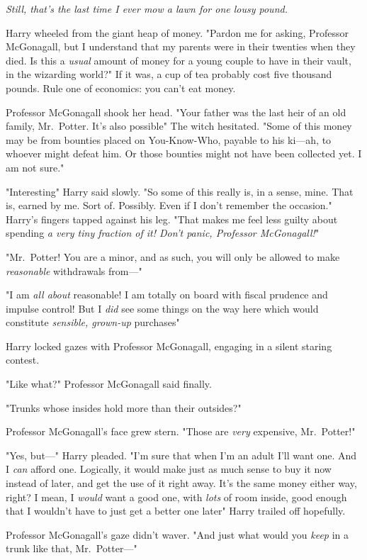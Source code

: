 \emph{Still, that's the last time I ever mow a lawn for one lousy pound.}

Harry wheeled from the giant heap of money. "Pardon me for asking, Professor
McGonagall, but I understand that my parents were in their twenties when they
died. Is this a \emph{usual} amount of money for a young couple to have in
their vault, in the wizarding world?" If it was, a cup of tea probably cost
five thousand pounds. Rule one of economics: you can't eat money.

Professor McGonagall shook her head. "Your father was the last heir of an old
family, Mr.~Potter. It's also possible{\el}" The witch hesitated. "Some of
this money may be from bounties placed on You-Know-Who, payable to his ki—ah,
to whoever might defeat him. Or those bounties might not have been collected
yet. I am not sure."

"Interesting{\el}" Harry said slowly. "So some of this really is, in a
sense, mine. That is, earned by me. Sort of. Possibly. Even if I don't remember
the occasion." Harry's fingers tapped against his leg. "That makes me
feel less guilty about spending \emph{a very tiny fraction of it! Don't panic,
Professor McGonagall!}"

"Mr.~Potter! You are a minor, and as such, you will only be allowed to make
\emph{reasonable} withdrawals from—"

"I am \emph{all about} reasonable! I am totally on board with fiscal prudence
and impulse control! But I \emph{did} see some things on the way here which
would constitute \emph{sensible, grown-up} purchases{\el}"

Harry locked gazes with Professor McGonagall, engaging in a silent staring
contest.

"Like what?" Professor McGonagall said finally.

"Trunks whose insides hold more than their outsides?"

Professor McGonagall's face grew stern. "Those are \emph{very} expensive,
Mr.~Potter!"

"Yes, but—" Harry pleaded. "I'm sure that when I'm an adult I'll want one.
And I \emph{can} afford one. Logically, it would make just as much sense to buy
it now instead of later, and get the use of it right away. It's the same money
either way, right? I mean, I \emph{would} want a good one, with \emph{lots} of
room inside, good enough that I wouldn't have to just get a better one
later{\el}" Harry trailed off hopefully.

Professor McGonagall's gaze didn't waver. "And just what would you \emph{keep}
in a trunk like that, Mr.~Potter—"

